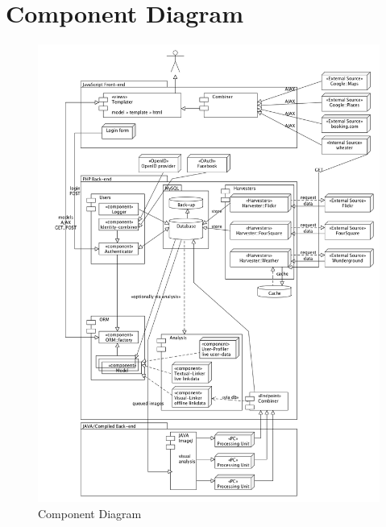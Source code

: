 \documentclass[a4paper,10pt]{article}
\begin{document}
		\clearpage

\appendix
	\section{Component Diagram} \label{sec:appendix1}
	\begin{figure}[ht!]
		\centering
		\includegraphics[width=\textwidth]{componentDiagram.png}
		\caption{Component Diagram \label{componentdiagramoverview}}
	\end{figure}
\end{document}
